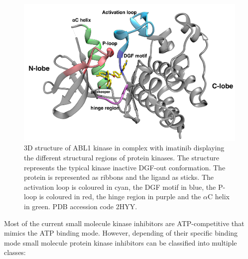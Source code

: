 \documentclass[11pt, b5paper,twoside]{tesi_upf}
\begin{document}
 \begin{figure}[htbp]
  
  \centering
    
   
	\includegraphics[width=1\linewidth]{../figures/kinase_structure.png}
	\caption[Schematic representation of the different structural regions of protein kinases]{3D structure of ABL1 kinase in complex with imatinib displaying the different structural regions of protein kinases. The structure represents the typical kinase inactive DGF-out conformation. The protein is represented as ribbons and the ligand as sticks. The activation loop is coloured in cyan, the DGF motif in blue, the P-loop is coloured in red, the hinge region in purple and the $\alpha$C helix in green. PDB accession code 2HYY.}
	\label{fig:kinase_general_conformation}
	
\end{figure}
\par Most of the current small molecule kinase inhibitors are ATP-competitive that mimics the ATP binding mode. However, depending of their specific binding mode small molecule protein kinase inhibitors can be classified into multiple classes:
\end{document}
